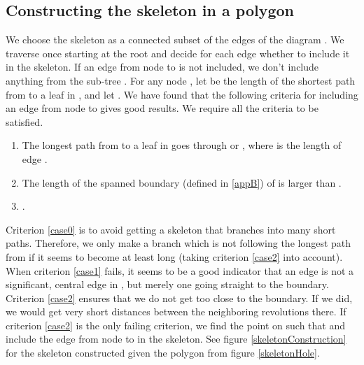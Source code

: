 \documentclass[3p]{elsarticle}
\begin{document}
\subsection{Constructing the skeleton in a polygon }

\begin{figure*}
\centering
{}\quad
{}
\caption{
 The diagram  of the polygon  from figure \ref{skeletonHole} in green,
where the edges chosen for the skeleton are black.  The diagram
 of
 with the skeleton considered an island . The cycle  is blue and the remaining edges are green.
The resulting spiral from figure \ref{spiralSkeletonHole} is included in gray.
}
\label{skeletonConstruction}
\end{figure*}

We choose the skeleton as a connected subset of the edges of the diagram .
We traverse  once starting at the root and decide for each edge whether to include it in the
skeleton. If an edge from node  to  is not included, we don't include anything from the sub-tree
.
For any node , let  be the length of the shortest path from  to a leaf in , and
let . We have found that the following criteria for including
an edge  from node  to  gives good results. We require all the criteria to be satisfied.
\begin{enumerate}
\setlength\itemsep{0em}
\item \label{case0} The longest path from  to a leaf in  goes
through  or , where  is the length of edge .

\item \label{case1} The length of the spanned boundary (defined in \ref{appB})
of  is larger than .

\item \label{case2} .
\end{enumerate}

Criterion \ref{case0} is to avoid getting a skeleton that branches into many short paths. Therefore,
we only make a branch which is not following the longest path from  if it seems to
become at least  long
(taking criterion \ref{case2} into account).
When criterion \ref{case1} fails,
it seems to be a good indicator that an edge is not a significant, central edge
in , but merely one going straight to the boundary.
Criterion \ref{case2} ensures that we do not get too close to the boundary. If we did, we would get
very short distances between the neighboring revolutions there. If
criterion \ref{case2} is the only failing criterion, we find the point  on  such that
 and include the edge from node  to 
in the skeleton. See figure \ref{skeletonConstruction} for the skeleton constructed
given the polygon from figure \ref{skeletonHole}.
\end{document}
